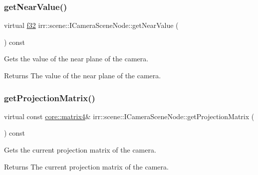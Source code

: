\subsubsection{\texorpdfstring{get\+Near\+Value()}{getNearValue()}\hspace{0.1cm}{\footnotesize\ttfamily [2/2]}}
{\footnotesize\ttfamily virtual \hyperlink{namespaceirr_a0277be98d67dc26ff93b1a6a1d086b07}{f32} irr\+::scene\+::\+I\+Camera\+Scene\+Node\+::get\+Near\+Value (\begin{DoxyParamCaption}{ }\end{DoxyParamCaption}) const\hspace{0.3cm}{\ttfamily [pure virtual]}}



Gets the value of the near plane of the camera. 

\begin{DoxyReturn}{Returns}
The value of the near plane of the camera. 
\end{DoxyReturn}
\mbox{\label{classirr_1_1scene_1_1ICameraSceneNode_a80f4a43d24dc31d797a84e0e2f62f1a1}} 
\subsubsection{\texorpdfstring{get\+Projection\+Matrix()}{getProjectionMatrix()}\hspace{0.1cm}{\footnotesize\ttfamily [1/2]}}
{\footnotesize\ttfamily virtual const \hyperlink{namespaceirr_1_1core_a4c9d4e29899535971052810954a14431}{core\+::matrix4}\& irr\+::scene\+::\+I\+Camera\+Scene\+Node\+::get\+Projection\+Matrix (\begin{DoxyParamCaption}{ }\end{DoxyParamCaption}) const\hspace{0.3cm}{\ttfamily [pure virtual]}}



Gets the current projection matrix of the camera. 

\begin{DoxyReturn}{Returns}
The current projection matrix of the camera. 
\end{DoxyReturn}
\mbox{\label{classirr_1_1scene_1_1ICameraSceneNode_a80f4a43d24dc31d797a84e0e2f62f1a1}} 
